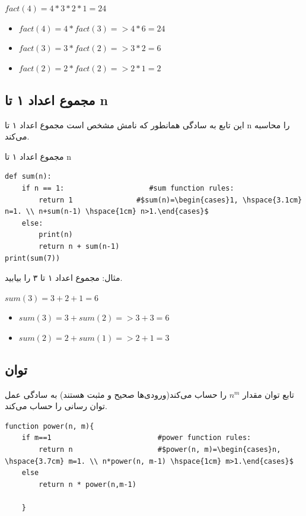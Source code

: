 \documentclass[a4paper]{article}
\begin{document}
\begin{LTR}
\(fact(4)=4*3*2*1=24\)
\begin{itemize}
\item \(fact(4)= 4*fact(3)=> 4*6=24\)
\item \(fact(3)=3*fact(2)=> 3*2=6\)
\item \(fact(2)=2*fact(2)=> 2*1=2\)
\end{itemize}
\end{LTR}


\subsection{مجموع اعداد ۱ تا n}
\label{sec:org10245cc}
این تابع به سادگی همانطور که نامش مشخص است مجموع اعداد ۱ تا n را محاسبه می‌کند.

\begin{listing}[H]
\caption{مجموع اعداد ۱ تا n}
\end{listing}
\begin{verbatim}
def sum(n):
    if n == 1:                    #sum function rules:
        return 1               #$sum(n)=\begin{cases}1, \hspace{3.1cm} n=1. \\ n+sum(n-1) \hspace{1cm} n>1.\end{cases}$
    else:
        print(n)
        return n + sum(n-1)
print(sum(7))
\end{verbatim}

مثال: مجموع اعداد ۱ تا ۳ را بیابید.

\begin{LTR}
\(sum(3)=3+2+1=6\)
\begin{itemize}
\item \(sum(3)=3+sum(2)=> 3+3=6\)
\item \(sum(2)=2+sum(1)=> 2+1=3\)
\end{itemize}
\end{LTR}

\subsection{توان}
\label{sec:orgef1a98f}
تابع توان مقدار \(n^m\) را حساب می‌کند(ورودی‌ها صحیح و مثبت هستند)
به سادگی عمل توان رسانی را حساب می‌کند.

\begin{verbatim}
function power(n, m){
    if m==1                         #power function rules:
        return n                    #$power(n, m)=\begin{cases}n, \hspace{3.7cm} m=1. \\ n*power(n, m-1) \hspace{1cm} m>1.\end{cases}$
    else
        return n * power(n,m-1)

    }
\end{verbatim}
\end{document}
